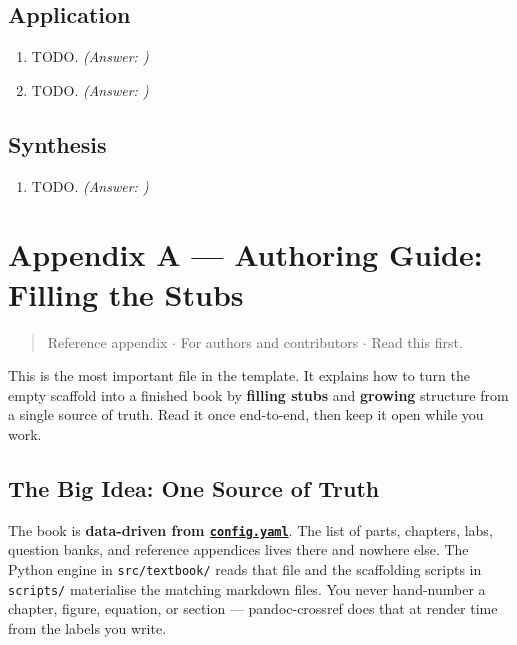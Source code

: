 \documentclass[
]{article}
\theoremstyle{plain}
\theoremstyle{definition}
\begin{document}
\subsection{Application}\label{application-11}

\begin{enumerate}
\def\labelenumi{\arabic{enumi}.}
\setcounter{enumi}{2}
\item
  TODO. \emph{(Answer: )}
\item
  TODO. \emph{(Answer: )}
\end{enumerate}

\subsection{Synthesis}\label{synthesis-11}

\begin{enumerate}
\def\labelenumi{\arabic{enumi}.}
\setcounter{enumi}{4}
\item
  TODO. \emph{(Answer: )}
\end{enumerate}

\newpage

\section{Appendix A --- Authoring Guide: Filling the
Stubs}\label{sec:appendix_authoring_guide}

\begin{quote}
Reference appendix \texorpdfstring{\ensuremath{\cdot}}{.} For authors and contributors \texorpdfstring{\ensuremath{\cdot}}{.} Read this first.
\end{quote}

This is the most important file in the template. It explains how to turn
the empty scaffold into a finished book by \textbf{filling stubs} and
\textbf{growing} structure from a single source of truth. Read it once
end-to-end, then keep it open while you work.

\subsection{The Big Idea: One Source of
Truth}\label{the-big-idea-one-source-of-truth}

The book is \textbf{data-driven from
\href{../config.yaml}{\texttt{config.yaml}}}. The list of parts,
chapters, labs, question banks, and reference appendices lives there and
nowhere else. The Python engine in \texttt{src/textbook/} reads that
file and the scaffolding scripts in \texttt{scripts/} materialise the
matching markdown files. You never hand-number a chapter, figure,
equation, or section --- pandoc-crossref does that at render time from
the labels you write.
\end{document}

